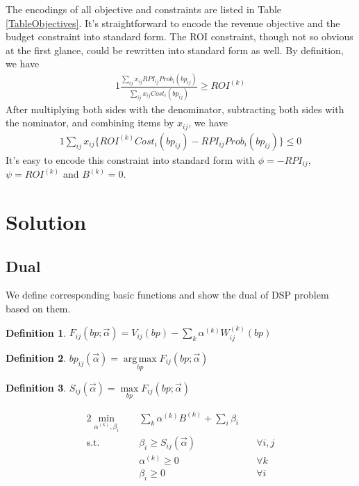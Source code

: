 \documentclass{article}
\DeclareMathOperator*{\argmax}{arg\,max}
\newtheorem{definition}{Definition}[section]
\newcommand{\sumi}{\sum\limits_i}
\newcommand{\sumk}{\sum\limits_k}
\newcommand{\sumij}{\sum\limits_{ij}}
\newcommand{\sx}{x_{ij}}
\newcommand{\sbp}{bp_{ij}}
\newcommand{\sumijx}[1]{\sumij\sx{}#1}
\newcommand{\sProb}{Prob_i(\sbp)}
\newcommand{\sCost}{Cost_i(\sbp)}
\newcommand{\sV}{V_{ij}}
\newcommand{\sW}{W_{ij}^{(k)}}
\newcommand{\sB}{B^{(k)}}
\newcommand{\sROI}{ROI^{(k)}}
\newcommand{\sCPI}{RPI_{ij}}
\newcommand{\sRevenuePforP}{\sumijx{\sCPI\sProb}}
\newcommand{\sBiddingCost}{\sumijx{\sCost}}
\newcommand{\salpha}{\alpha^{(k)}}
\newcommand{\sbeta}{\beta_i}
\newcommand{\sF}{F_{ij}}
\newcommand{\sS}{S_{ij}}
\newcommand{\valpha}{\vec{\alpha}}
\newcommand{\pprob}{\phi}
\newcommand{\pcost}{\psi}
\newcommand{\scoreconstraint}{\sbeta \ge \sS(\vec{\alpha})}
\begin{document}
The encodings of all objective and constraints are listed in Table \ref{TableObjectives}.
It's straightforward to encode the revenue objective and the budget constraint into standard form.
The ROI constraint, though not so obvious at the first glance, could be rewritten into standard form as well.
By definition, we have
\begin{alignat}{1}
\frac{\sRevenuePforP}{\sBiddingCost}\ge\sROI
\end{alignat}
After multiplying both sides with the denominator,
    subtracting both sides with the nominator,
    and combining items by $\sx$, we have
\begin{alignat}{1}
\sumijx{\{\sROI\sCost-\sCPI\sProb\}}\le0
\end{alignat}
It's easy to encode this constraint into standard form with $\pprob=-\sCPI$, $\pcost=\sROI$ and $\sB=0$.

\section{Solution} \label{Solution}

\subsection{Dual}

We define corresponding basic functions and show the dual of DSP problem based on them.

\begin{definition}
$\sF(bp; \valpha) = \sV(bp) - \sumk \salpha \sW(bp)$
\end{definition}

\begin{definition}
$\sbp(\valpha) = \argmax\limits_{bp} \sF(bp; \valpha)$
\end{definition}

\begin{definition}
$\sS(\valpha) = \max\limits_{bp} \sF(bp; \valpha)$
\end{definition}

\begin{alignat}{2}
    \min\limits_{\salpha, \sbeta} \quad & \sumk \salpha \sB + \sumi \sbeta \quad & {} \\
    \mbox{s.t.} \quad                   & \scoreconstraint \quad                 & \forall i,j \\
    \quad                               & \salpha \ge 0 \quad                    & \forall k \\
    \quad                               & \sbeta \ge 0 \quad                     & \forall i
\end{alignat}
\end{document}
